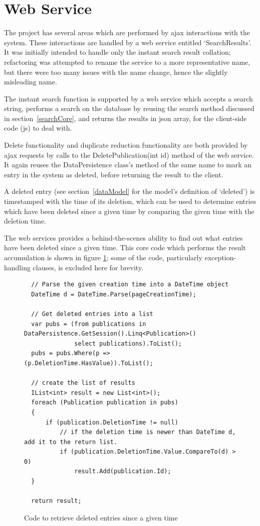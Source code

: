\section{Web Service}
The project has several areas which are performed by \gls{ajax} interactions with the system.  These interactions are handled by a web service entitled `SearchResults'. It was initially intended to handle only the instant search result collation; refactoring was attempted to rename the service to a more representative name, but there were too many issues with the name change, hence the slightly misleading name.

The instant search function is supported by a web service which accepts a search string, performs a search on the database by reusing the search method discussed in section~\ref{searchCore}, and returns the results in \gls{json} array, for the client-side code (\gls{js}) to deal with.  

Delete functionality and duplicate reduction functionality are both provided by \gls{ajax} requests by calls to the DeletePublication(int id) method of the web service.  It again reuses the DataPersistence class's method of the same name to mark an entry in the system as deleted, before returning the result to the client.

A deleted entry (see section~\ref{dataModel} for the model's definition of `deleted') is timestamped with the time of its deletion, which can be used to determine entries which have been deleted since a given time by comparing the given time with the deletion time. 

The web services provides a behind-the-scenes ability to find out what entries have been deleted since a given time.  This core code which performs the result accumulation is shown in figure \ref{fig:getDeletedPublicationsWS}; some of the code, particularly exception-handling clauses, is excluded here for brevity.

\begin{figure}
	\begin{center}
			\lstset{language=CSharp} 
			\begin{lstlisting}
  // Parse the given creation time into a DateTime object
  DateTime d = DateTime.Parse(pageCreationTime);

  // Get deleted entries into a list
  var pubs = (from publications in DataPersistence.GetSession().Linq<Publication>()
              select publications).ToList();
  pubs = pubs.Where(p => (p.DeletionTime.HasValue)).ToList();

  // create the list of results
  IList<int> result = new List<int>();
  foreach (Publication publication in pubs)
  {
      if (publication.DeletionTime != null)
          // if the deletion time is newer than DateTime d, add it to the return list.
          if (publication.DeletionTime.Value.CompareTo(d) > 0)
              result.Add(publication.Id);
  }

  return result;
			\end{lstlisting}
		\caption{Code to retrieve deleted entries since a given time}
		\label{fig:getDeletedPublicationsWS}
	\end{center}
\end{figure}

